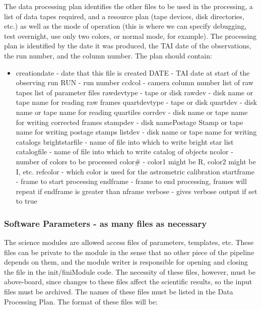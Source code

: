 	The data processing plan identifies the other files to be used in
the processing, a list of data tapes required, and a resource plan (tape
devices, disk directories, etc.) as well as the mode of operation (this is
where we can specify debugging, test overnight, use only two colors, or
normal mode, for example).  The processing plan is identified by the date
it was produced, the TAI date of the observations, the run number, and the 
column number.
The plan should contain:
\begin{itemize}
\item creationdate - date that this file is created
\sitem DATE - TAI date at start of the observing run
\sitem RUN - run number
\sitem ccdcol - camera column number
\sitem list of raw tapes
\sitem list of parameter files
\sitem rawdevtype - tape or disk
\sitem rawdev - disk name or tape name for reading raw frames
\sitem quartdevtype - tape or disk
\sitem quartdev - disk name or tape name for reading quartiles
\sitem corrdev - disk name or tape name for writing corrected frames
\sitem stampdev - disk namePostage Stamp or tape name for writing postage stamps
\sitem listdev - disk name or tape name for writing catalogs
\sitem brightstarfile - name of file into which to write bright star list
\sitem catalogfile - name of file into which to write catalog of objects
\sitem ncolor - number of colors to be processed
\sitem color\# - color1 might be R, color2 might be I, etc.
\sitem refcolor - which color is used for the astrometric calibration
\sitem startframe - frame to start processing
\sitem endframe - frame to end processing, frames will repeat if endframe is greater than nframe
\sitem verbose - gives verbose output if set to true
\end{itemize}

\subsubsection{Software Parameters - as many files as necessary}

The science modules are allowed access files of parameters, templates, etc.
These files can be private to the module in the sense that no other piece
of the pipeline depends on them, and the module writer is responsible for
opening and closing the file in the init/finiModule code.  The necessity
of these files, however, must be above-board, since changes to these files
affect the scientific results, so the input files must be archived.  The
names of these files must be listed in the Data Processing Plan.  The format
of these files will be:


